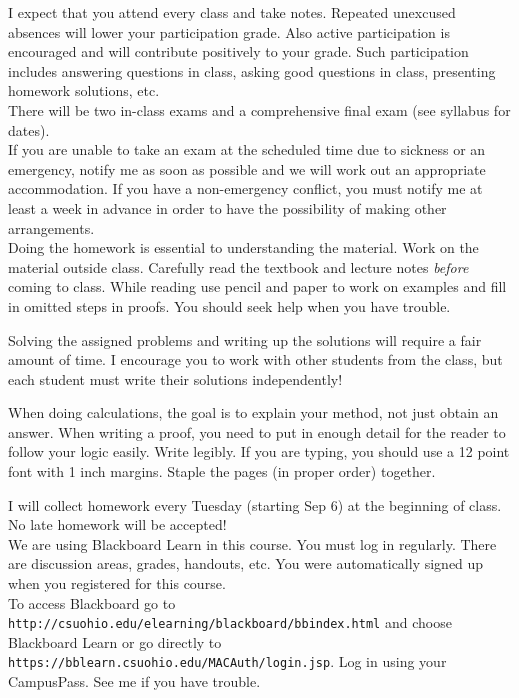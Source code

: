 \documentclass[11pt]{article}
\begin{document}
I expect that  you attend every class and take notes. Repeated
unexcused absences will lower your participation grade.
Also active participation is encouraged and will contribute
positively to your grade. Such participation includes answering
questions in class, asking good questions in class, presenting
homework solutions, etc. \\

There will be two in-class exams and a comprehensive final exam (see
syllabus for dates). \\

If you are unable to take an exam at the scheduled time due to
sickness or an emergency, notify me as soon as possible and we will
work out an appropriate accommodation. If you have a non-emergency
conflict, you must notify me at least a week in
advance in order to have the possibility of making other arrangements.\\

Doing the homework is essential to understanding the material. 
Work on the material outside class. Carefully read the textbook and lecture notes {\it before}
coming to class. While reading use pencil and paper to work on examples and fill in
omitted steps in proofs.  You should seek help when you have trouble.

Solving the assigned problems and writing up the solutions will require a fair amount of time.
I encourage you to work with other students from the class, but each student
must write their solutions independently! 

 When doing calculations, the goal is to explain your
method, not just obtain an answer. When writing a proof, you need to put in enough detail
for the reader to follow your logic easily.
Write legibly. If you are typing, you should use a 12 point
font with 1 inch margins. Staple the pages (in proper order) together.

I will collect homework every Tuesday (starting Sep 6) at the beginning of class. 
No late homework will be accepted!\\



 
 We are using Blackboard Learn in this course.
You must log in regularly. There are discussion areas,
grades, handouts, etc. You were automatically signed up when
you registered for this course.\\ To access Blackboard go to
{\tt http://csuohio.edu/elearning/blackboard/bbindex.html} and choose Blackboard Learn
or go directly to
{\tt https://bblearn.csuohio.edu/MACAuth/login.jsp}. Log in using your
CampusPass. See me if you have trouble.\\
\end{document}
